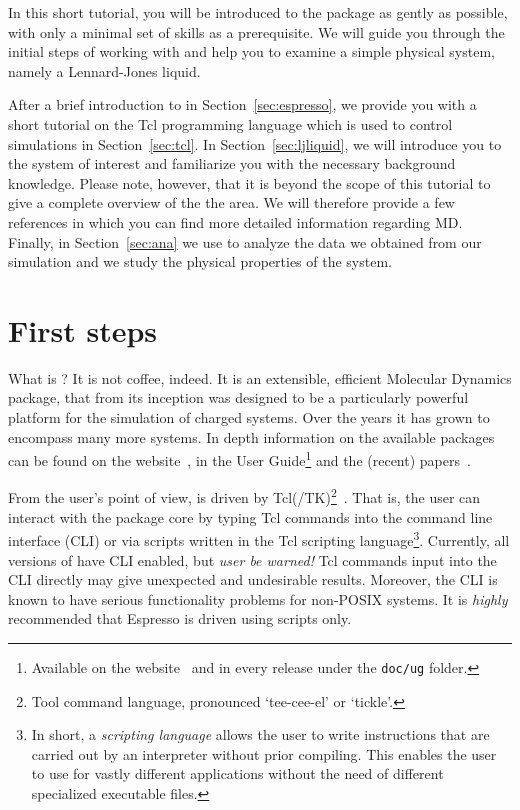 \documentclass[
paper=a4,                       %
fontsize=11pt,                  %
twoside,                        %
footsepline,                    %
headsepline,                    %
headinclude=false,              %
footinclude=false,              %
pagesize,                       %
]{scrartcl}
\begin{document}
In this short tutorial, you will be introduced to the \es{} package as gently as possible, with only a minimal set of skills as a prerequisite. We will guide you through the initial steps of working with \es{} and help you to examine a simple physical system, namely a Lennard-Jones liquid.

After a brief introduction to \es{} in Section~\ref{sec:espresso}, we provide you with a short tutorial on the Tcl programming language which is used to control \es{} simulations in Section~\ref{sec:tcl}. In Section~\ref{sec:ljliquid}, we will introduce you to the system of interest and familiarize you with the necessary background knowledge. Please note, however, that it is beyond the scope of this tutorial to give a complete overview of the the area. We will therefore provide a few references in which you can find more detailed information regarding MD. Finally, in Section~\ref{sec:ana} we use \es{} to analyze the data we obtained from our simulation and we study the physical properties of the system. 


\section{\label{sec:espresso}First steps}

What is \es{}? It is not coffee, indeed. It is an extensible, efficient Molecular Dynamics package, that from its inception was designed to be a particularly powerful platform for the simulation of charged systems. Over the years it has grown to encompass many more systems. In depth information on the available packages can be found on the \es{} website~\cite{esp_url}, in the User Guide\footnote{Available on the \es{} website~\cite{esp_url} and in every release under the \texttt{doc/ug} folder.} and the (recent) papers~\cite{arnold2003ees,limbach2006ees,Roehm2012}.

From the user's point of view, \es{} is driven by Tcl(/TK)\footnote{Tool command language, pronounced `tee-cee-el' or `tickle'.}~\cite{tcl_url}. That is, the user can interact with the package core by typing Tcl commands into the command line interface (CLI) or via scripts written in the Tcl scripting language\footnote{In short, a \emph{scripting language} allows the user to write instructions that are carried out by an interpreter without prior compiling. This enables the user to use \es{} for vastly different applications without the need of different specialized executable files.}. Currently, all versions of \es{} have CLI enabled, but \emph{user be warned!} Tcl commands input into the CLI directly may give unexpected and undesirable results. Moreover, the CLI is known to have serious functionality problems for non-POSIX systems. It is \emph{highly} recommended that Espresso is driven using scripts only. 
\end{document}
